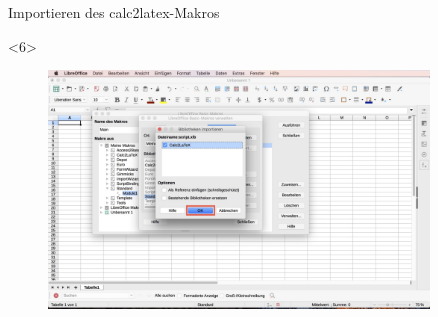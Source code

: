 \documentclass["WS\space 16-17\space -\space LaTeX-Kurs\space -\space Praesentation\space -\space 2.tex"]{subfiles}
\begin{document}
\begin{frame}[c]{Importieren des calc2latex-Makros}
\begin{onlyenv}
\begin{figure}[htbp]
		\end{figure}
	\end{onlyenv}
	\begin{onlyenv}
		\begin{figure}[htbp]
			\centering
			\includegraphics[width=0.9\textwidth]{img/Bildschirmfoto_mitKasten/1_Importieren_Macro/6.jpg}
		\end{figure}
	\end{onlyenv}
\end{frame}
\end{document}

